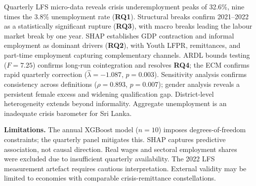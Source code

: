 \documentclass[conference]{IEEEtran}
\begin{document}
Quarterly LFS micro-data reveals crisis underemployment peaks of
32.6\%, nine times the 3.8\% unemployment rate (\textbf{RQ1}).
Structural breaks confirm 2021--2022 as a statistically significant
rupture (\textbf{RQ3}), with macro breaks leading the labour market
break by one year. SHAP establishes GDP contraction and informal
employment as dominant drivers (\textbf{RQ2}), with Youth LFPR,
remittances, and part-time employment capturing complementary channels.
ARDL bounds testing ($F{=}7.25$) confirms long-run cointegration and
resolves \textbf{RQ4}; the ECM confirms rapid quarterly correction
($\hat\lambda{=}{-}1.087$, $p{=}0.003$). Sensitivity analysis confirms
consistency across definitions ($\rho{=}0.893$, $p{=}0.007$); gender
analysis reveals a persistent female excess and widening qualification
gap. District-level heterogeneity extends beyond informality. Aggregate
unemployment is an inadequate crisis barometer for Sri Lanka.

\textbf{Limitations.} The annual XGBoost model ($n{=}10$) imposes
degrees-of-freedom constraints; the quarterly panel mitigates this.
SHAP captures predictive association, not causal direction. Real wages
and sectoral employment shares were excluded due to insufficient
quarterly availability. The 2022 LFS measurement artefact requires
cautious interpretation. External validity may be limited to economies
with comparable crisis-remittance constellations.




\end{document}

